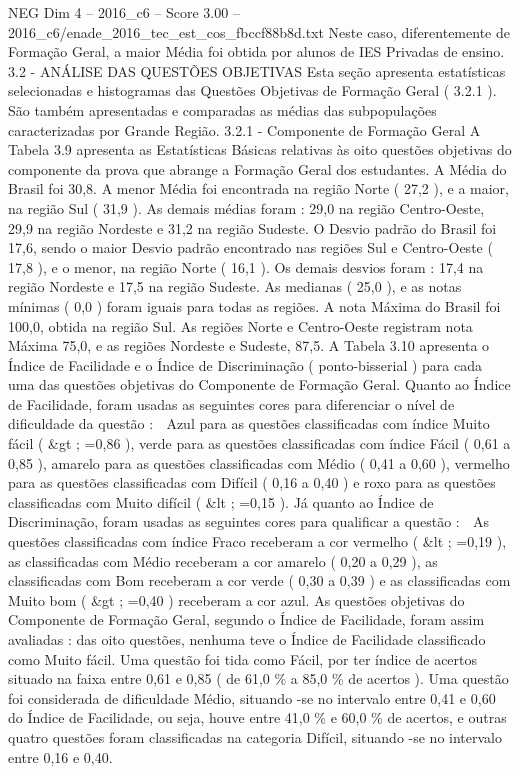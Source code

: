 \begin{textsample}{NEG Dim 4 – 2016\_c6 – Score 3.00 – 2016\_c6/enade\_2016\_tec\_est\_cos\_fbccf88b8d.txt}
Neste caso, diferentemente de Formação Geral, a maior Média foi obtida por alunos de IES Privadas de ensino. 3.2 - ANÁLISE DAS QUESTÕES OBJETIVAS Esta seção apresenta estatísticas selecionadas e histogramas das Questões Objetivas de Formação Geral ( 3.2.1 ).
São também apresentadas e comparadas as médias das subpopulações caracterizadas por Grande Região. 3.2.1 - Componente de Formação Geral A Tabela 3.9 apresenta as Estatísticas Básicas relativas às oito questões objetivas do componente da prova que abrange a Formação Geral dos estudantes.
A Média do Brasil foi 30,8.
A menor Média foi encontrada na região Norte ( 27,2 ), e a maior, na região Sul ( 31,9 ).
As demais médias foram : 29,0 na região Centro-Oeste, 29,9 na região Nordeste e 31,2 na região Sudeste.
O Desvio padrão do Brasil foi 17,6, sendo o maior Desvio padrão encontrado nas regiões Sul e Centro-Oeste ( 17,8 ), e o menor, na região Norte ( 16,1 ).
Os demais desvios foram : 17,4 na região Nordeste e 17,5 na região Sudeste.
As medianas ( 25,0 ), e as notas mínimas ( 0,0 ) foram iguais para todas as regiões.
A nota Máxima do Brasil foi 100,0, obtida na região Sul.
As regiões Norte e Centro-Oeste registram nota Máxima 75,0, e as regiões Nordeste e Sudeste, 87,5.
A Tabela 3.10 apresenta o Índice de Facilidade e o Índice de Discriminação ( ponto-bisserial ) para cada uma das questões objetivas do Componente de Formação Geral.
Quanto ao Índice de Facilidade, foram usadas as seguintes cores para diferenciar o nível de dificuldade da questão :  Azul para as questões classificadas com índice Muito fácil ( \&gt ; =0,86 ), verde para as questões classificadas com índice Fácil ( 0,61 a 0,85 ), amarelo para as questões classificadas com Médio ( 0,41 a 0,60 ), vermelho para as questões classificadas com Difícil ( 0,16 a 0,40 ) e roxo para as questões classificadas com Muito difícil ( \&lt ; =0,15 ).
Já quanto ao Índice de Discriminação, foram usadas as seguintes cores para qualificar a questão :  As questões classificadas com índice Fraco receberam a cor vermelho ( \&lt ; =0,19 ), as classificadas com Médio receberam a cor amarelo ( 0,20 a 0,29 ), as classificadas com Bom receberam a cor verde ( 0,30 a 0,39 ) e as classificadas com Muito bom ( \&gt ; =0,40 ) receberam a cor azul.
As questões objetivas do Componente de Formação Geral, segundo o Índice de Facilidade, foram assim avaliadas : das oito questões, nenhuma teve o Índice de Facilidade classificado como Muito fácil.
Uma questão foi tida como Fácil, por ter índice de acertos situado na faixa entre 0,61 e 0,85 ( de 61,0 \% a 85,0 \% de acertos ).
Uma questão foi considerada de dificuldade Médio, situando -se no intervalo entre 0,41 e 0,60 do Índice de Facilidade, ou seja, houve entre 41,0 \% e 60,0 \% de acertos, e outras quatro questões foram classificadas na categoria Difícil, situando -se no intervalo entre 0,16 e 0,40.

\end{textsample}
